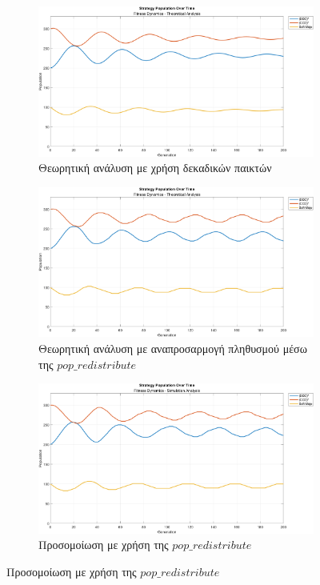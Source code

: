 \documentclass[a4paper,12pt]{article}
\begin{document}
\begin{figure}[h!]
\centering

\begin{subfigure}[b]{0.6\textwidth}
    \centering
    \includegraphics[width=\textwidth]{Graphs/theoretical_fit.png}
    \caption{Θεωρητική ανάλυση με χρήση δεκαδικών παικτών}
    \label{fig:the_fit2_dec}
\end{subfigure}
\hfill
\begin{subfigure}[b]{0.6\textwidth}
    \centering
    \includegraphics[width=\textwidth]{Graphs/theoretical_fit_pop_red.png}
    \caption{Θεωρητική ανάλυση με αναπροσαρμογή πληθυσμού μέσω της $pop\_redistribute$}
    \label{fig:the_fit2_pr}
\end{subfigure}

\vspace{1em}

\begin{subfigure}[b]{0.6\textwidth}
    \centering
    \includegraphics[width=\textwidth]{Graphs/fit_sim2.png}
    \caption{Προσομοίωση με χρήση της $pop\_redistribute$}
    \label{fig:sim_fit2}
\end{subfigure}


\end{figure}
\end{document}
